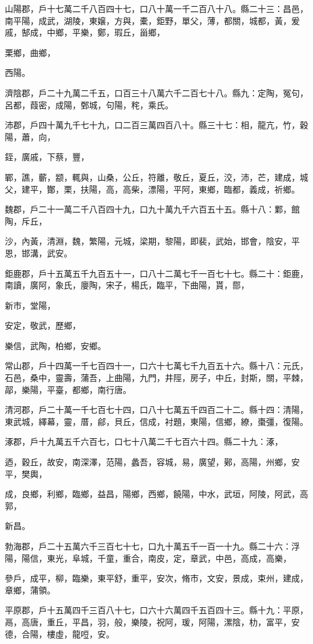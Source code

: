 \begin{pinyinscope}
山陽郡，戶十七萬二千八百四十七，口八十萬一千二百八十八。縣二十三：昌邑，南平陽，成武，湖陵，東嬢，方與，橐，鉅野，單父，薄，都關，城都，黃，爰戚，郜成，中鄉，平樂，鄭，瑕丘，甾鄉，

栗鄉，曲鄉，

西陽。

濟陰郡，戶二十九萬二千五，口百三十八萬六千二百七十八。縣九：定陶，冤句，呂都，葭密，成陽，鄄城，句陽，秺，乘氏。

沛郡，戶四十萬九千七十九，口二百三萬四百八十。縣三十七：相，龍亢，竹，穀陽，蕭，向，

銍，廣戚，下蔡，豐，

鄲，譙，蘄，颛，輒與，山桑，公丘，符離，敬丘，夏丘，洨，沛，芒，建成，城父，建平，酇，栗，扶陽，高，高柴，漂陽，平阿，東鄉，臨都，義成，祈鄉。

魏郡，戶二十一萬二千八百四十九，口九十萬九千六百五十五。縣十八：鄴，館陶，斥丘，

沙，內黃，清淵，魏，繁陽，元城，梁期，黎陽，即裴，武始，邯會，陰安，平恩，邯溝，武安。

鉅鹿郡，戶十五萬五千九百五十一，口八十二萬七千一百七十七。縣二十：鉅鹿，南讀，廣阿，象氏，廮陶，宋子，楊氏，臨平，下曲陽，貰，郻，

新巿，堂陽，

安定，敬武，歷鄉，

樂信，武陶，柏鄉，安鄉。

常山郡，戶十四萬一千七百四十一，口六十七萬七千九百五十六。縣十八：元氏，石邑，桑中，靈壽，蒲吾，上曲陽，九門，井陘，房子，中丘，封斯，關，平棘，鄗，樂陽，平臺，都鄉，南行唐。

清河郡，戶二十萬一千七百七十四，口八十七萬五千四百二十二。縣十四：清陽，東武城，繹幕，靈，厝，鄃，貝丘，信成，衬題，東陽，信鄉，繚，棗彊，復陽。

涿郡，戶十九萬五千六百七，口七十八萬二千七百六十四。縣二十九：涿，

迺，穀丘，故安，南深澤，范陽，蠡吾，容城，易，廣望，鄚，高陽，州鄉，安平，樊輿，

成，良鄉，利鄉，臨鄉，益昌，陽鄉，西鄉，饒陽，中水，武垣，阿陵，阿武，高郭，

新昌。

勃海郡，戶二十五萬六千三百七十七，口九十萬五千一百一十九。縣二十六：浮陽，陽信，東光，阜城，千童，重合，南皮，定，章武，中邑，高成，高樂，

參戶，成平，柳，臨樂，東平舒，重平，安次，脩市，文安，景成，束州，建成，章鄉，蒲領。

平原郡，戶十五萬四千三百八十七，口六十六萬四千五百四十三。縣十九：平原，鬲，高唐，重丘，平昌，羽，般，樂陵，祝阿，瑗，阿陽，漯陰，朸，富平，安德，合陽，樓虛，龍哣，安。


\end{pinyinscope}
